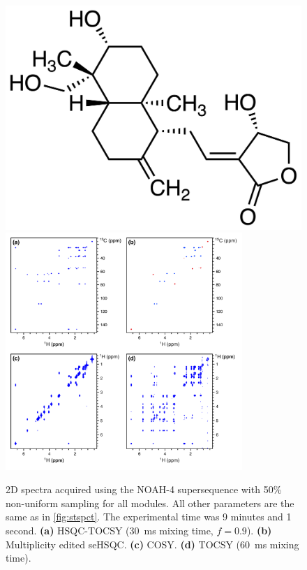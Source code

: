 \begin{figure}
    \centering
    \includegraphics{./figures/andro.png}\phantom{aaaaaa}
    \includegraphics[width=0.8\textwidth]{./figures/stspct_nus.png}
    \caption{
        2D spectra acquired using the NOAH-4  supersequence with 50\% non-uniform sampling for all modules.
        All other parameters are the same as in \cref{fig:stspct}.
        The experimental time was 9 minutes and 1 second.
        \textbf{(a)} HSQC-TOCSY (\SI{30}{ms} mixing time, $f = 0.9$).
        \textbf{(b)} Multiplicity edited seHSQC.
        \textbf{(c)} COSY.
        \textbf{(d)} TOCSY (\SI{60}{ms} mixing time).
        \andro{}
    }
    \label{fig:stspct_nus}
\end{figure}

